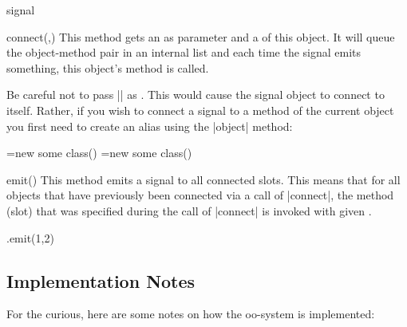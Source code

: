 \begin{ooclass}{signal}
  \begin{method}{connect(,)}
    This method gets an  as parameter and a
     of this object. It will queue the object-method
    pair in an internal list and each time the signal emits something,
    this object's method is called.

    Be careful not to pass |\pgfoothis| as . This
    would cause the signal object to connect to itself. Rather, if you
    wish to connect a signal to a method of the current object you
    first need to create an alias using the |object| method:
\begin{codeexample}
\pgfoonew \objA=new some class()
\pgfoonew \objB=new some class()
\end{codeexample}
  \end{method}

  \begin{method}{emit()}
    This method emits a signal to all connected slots. This means that
    for all objects that have previously been connected via a call of
    |connect|, the method (slot) that was specified during the call of
    |connect| is invoked with given .
\begin{codeexample}
\anothersignal.emit(1,2)
\end{codeexample}
  \end{method}
\end{ooclass}


\subsection{Implementation Notes}

For the curious, here are some notes on how the oo-system is
implemented:

